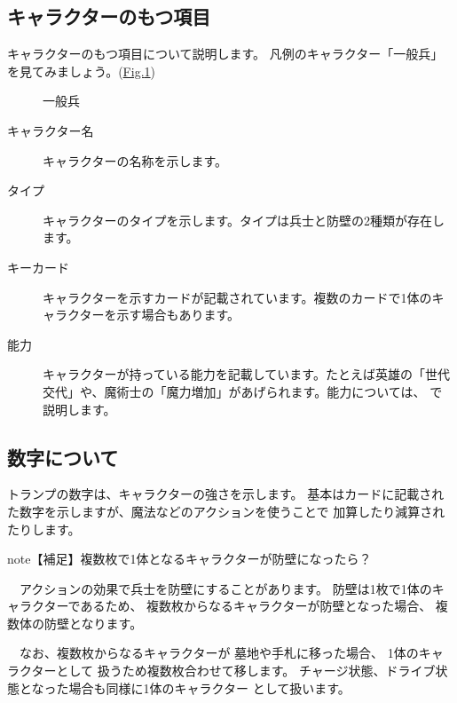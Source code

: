 \documentclass[letterpaper,10pt,dvipdfmx]{sphinxmanual}
\begin{document}
\subsection{キャラクターのもつ項目}
\label{\detokenize{common/04-character:id3}}
キャラクターのもつ項目について説明します。
凡例のキャラクター「一般兵」を見てみましょう。(\hyperref[\detokenize{common/04-character:character-sample}]{Fig.\@ \ref{\detokenize{common/04-character:character-sample}}})

\begin{figure}[htbp]
\centering
\capstart

\noindent{}
\caption{一般兵}\label{\detokenize{common/04-character:id11}}\label{\detokenize{common/04-character:character-sample}}\end{figure}
\begin{description}
\item[{キャラクター名}] \leavevmode
キャラクターの名称を示します。

\item[{タイプ}] \leavevmode
キャラクターのタイプを示します。タイプは兵士と防壁の2種類が存在します。

\item[{キーカード}] \leavevmode
キャラクターを示すカードが記載されています。複数のカードで1体のキャラクターを示す場合もあります。

\item[{能力}] \leavevmode
キャラクターが持っている能力を記載しています。たとえば英雄の「世代交代」や、魔術士の「魔力増加」があげられます。能力については、 {\hyperref[\detokenize{common/04-character:abi}]{}} で説明します。

\end{description}


\subsection{数字について}
\label{\detokenize{common/04-character:id4}}
トランプの数字は、キャラクターの強さを示します。
基本はカードに記載された数字を示しますが、魔法などのアクションを使うことで
加算したり減算されたりします。

\begin{sphinxadmonition}{note}{【補足】複数枚で1体となるキャラクターが防壁になったら？}

　アクションの効果で兵士を防壁にすることがあります。
防壁は1枚で1体のキャラクターであるため、
複数枚からなるキャラクターが防壁となった場合、
複数体の防壁となります。

　なお、複数枚からなるキャラクターが
墓地や手札に移った場合、
1体のキャラクターとして
扱うため複数枚合わせて移します。
チャージ状態、ドライブ状態となった場合も同様に1体のキャラクター
として扱います。
\end{sphinxadmonition}
\end{document}
